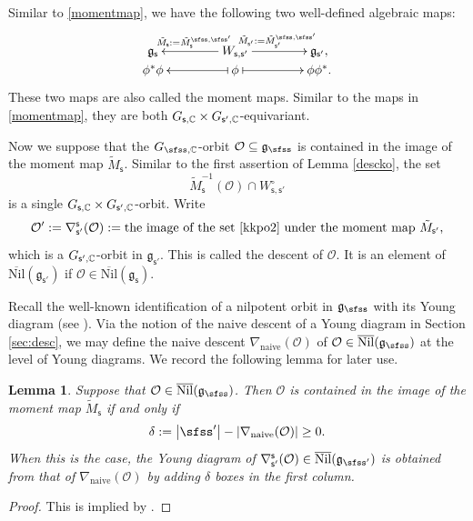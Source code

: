 \documentclass[11pt,a4paper]{amsart}
\def\abs#1{\left|{#1}\right|}
\newcommand{\CO}{{\mathcal {O}}}
\newcommand{\g}{\mathfrak g}
\def\DD{\nabla}
\newcommand{\be}{\begin {equation}}
\newcommand{\ee}{\end {equation}}
\numberwithin{equation}{section}
\newtheorem{lem}[thm]{Lemma}
\theoremstyle{remark}
\def\subset{\subseteq}
\def\Nil{\overline{\mathrm{Nil}}}
\begin{document}
Similar to \eqref{momentmap}, we have the following two well-defined algebraic maps:
   \be\label{momentmap2}
    \xymatrix@R=0em@C=4em{
      \g_\mathsf s &\ar[l]_{\tilde M_\mathsf s:=\tilde M_\mathsf s^{\sfss, \sfss'}} W_{\mathsf s, \mathsf s'}\ar[r]^{\tilde M_{\mathsf s'}:=\tilde M_{\mathsf s'}^{\sfss, \sfss'}}& \g_{\mathsf s'},\\
     \phi^* \phi & \ar@{|->}[l] \phi \ar@{|->}[r] & \phi \phi^*.
    }
  \ee
These two maps are also called the moment maps. Similar to the maps in \eqref{momentmap},   they  are both $G_{\mathsf s,\mathbb{C}}\times G_{\mathsf s', \mathbb{C}}$-equivariant.



Now we suppose that the $G_{\sfss, \C}$-orbit $\CO\subset\g_\sfss$
  is contained in the image of the moment map $\tilde M_{\mathsf s}$. Similar to
the first assertion of Lemma \ref{descko}, the set
\be\label{kkpo2}
  \tilde M_{\mathsf s}^{-1}(\CO)\cap W_{\mathsf s, \mathsf s'}^\circ
\ee
is a single $G_{\mathsf s,\mathbb{C}}\times G_{\mathsf s', \mathbb{C}}$-orbit.
Write
\[
 \CO':= \nabla^{\mathsf s}_{\mathsf s'}(\CO):=\textrm{the image of the set \eqref{kkpo2} under the moment map  $\tilde M_{\mathsf s'}$,}
\]
which is a $ G_{\mathsf s', \mathbb{C}}$-orbit in $\g_{\mathsf s'}$.
This is  called the descent of $\CO$. It is an element of  $\Nil(\g_{\mathsf s'})$ if $\CO\in \Nil(\g_{\mathsf s})$.

Recall the well-known identification of a nilpotent orbit in $\g_\sfss$ with its Young diagram (see \cite{CM}). 
Via the notion of the naive descent of a Young diagram in Section \ref{sec:desc}, we may define the naive descent $\DD_\mathrm{naive}(\CO)$ of $\CO\in \Nil(\g_\sfss)$ at the level of Young diagrams. We record the following lemma for later use.

\begin{lem}\label{imageofmm}
Suppose that $\CO\in \Nil(\g_\sfss)$. Then  $\CO$ is contained in the image of the moment map $\tilde M_{\mathsf s}$ if and only if
\[
\delta:=  \abs{\sfss'}-\abs{\DD_\mathrm{naive}(\CO)}\geq 0.
\]
When this is the case, the Young diagram of $\DD_{\mathsf s'}^{\mathsf s}(\CO)\in \Nil(\g_{\sfss'})
$ is obtained from that of $\DD_\mathrm{naive}(\CO)$ by adding $\delta$ boxes in the first column.
\end{lem}
\begin{proof}
This is implied by \cite[Theorem 3.6]{DKPC}.
\end{proof}
\end{document}
